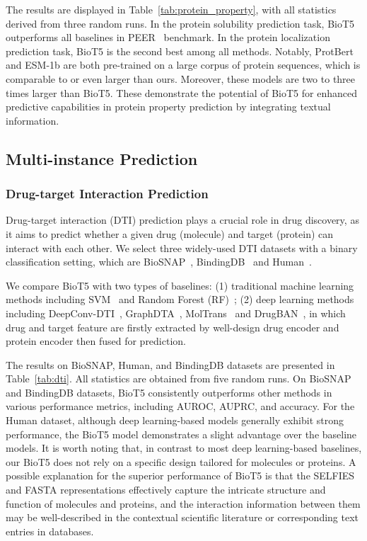\documentclass[11pt]{article}
\newcommand{\method}{{BioT5}}
\begin{document}
The results are displayed in Table~\ref{tab:protein_property}, with all statistics derived from three random runs.
In the protein solubility prediction task, \method{} outperforms all baselines in PEER~\citep{xu2022peer} benchmark.
In the protein localization prediction task, \method{} is the second best among all methods.
Notably, ProtBert and ESM-1b are both pre-trained on a large corpus of protein sequences, which is comparable to or even larger than ours.
Moreover, these models are two to three times larger than \method{}.
These demonstrate the potential of \method{} for enhanced predictive capabilities in protein property prediction by integrating textual information.


\subsection{Multi-instance Prediction}
\label{sec:multi_instance}
\subsubsection{Drug-target Interaction Prediction}
\label{sec:dti}
Drug-target interaction (DTI) prediction plays a crucial role in drug discovery, as it aims to predict whether a given drug (molecule) and target (protein) can interact with each other.
We select three widely-used DTI datasets with a binary classification setting, which are BioSNAP~\citep{zitnik2018biosnap}, BindingDB~\citep{liu2007bindingdb} and Human~\citep{liu2015improving,chen2020transformercpi}.

We compare \method{} with two types of baselines:
(1) traditional machine learning methods including SVM~\citep{cortes1995support} and Random Forest (RF)~\citep{ho1995random};
(2) deep learning methods including DeepConv-DTI~\citep{Lee2019DeepConvDTIPO}, GraphDTA~\citep{Nguyen2020GraphDTAPD}, MolTrans~\citep{Huang2021MolTransMI} and DrugBAN~\citep{bai2023interpretable}, in which drug and target feature are firstly extracted by well-design drug encoder and protein encoder then fused for prediction.

The results on BioSNAP, Human, and BindingDB datasets are presented in Table~\ref{tab:dti}. All statistics are obtained from five random runs.
On BioSNAP and BindingDB datasets, \method{} consistently outperforms other methods in various performance metrics, including AUROC, AUPRC, and accuracy.
For the Human dataset, although deep learning-based models generally exhibit strong performance, the \method{} model demonstrates a slight advantage over the baseline models.
It is worth noting that, in contrast to most deep learning-based baselines, our \method{} does not rely on a specific design tailored for molecules or proteins. A possible explanation for the superior performance of \method{} is that the SELFIES and FASTA representations effectively capture the intricate structure and function of molecules and proteins, and the interaction information between them may be well-described in the contextual scientific literature or corresponding text entries in databases.
\end{document}
